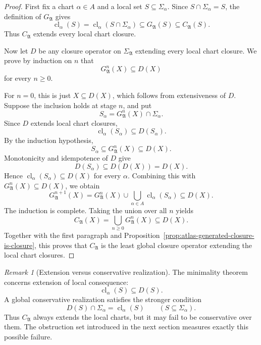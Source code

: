 \documentclass[11pt]{amsart}
\numberwithin{equation}{section}
\theoremstyle{plain}
\theoremstyle{definition}
\theoremstyle{remark}
\newtheorem{remark}[theorem]{Remark}
\newcommand{\Cl}{\operatorname{cl}}
\newcommand{\A}{\mathfrak A}
\newcommand{\Sig}{\Sigma}
\newcommand{\CA}{C_{\mathfrak A}}
\newcommand{\GA}{G_{\mathfrak A}}
\begin{document}
\begin{proof}
First fix a chart \(\alpha\in A\) and a local set \(S\subseteq\Sig_\alpha\). Since \(S\cap\Sig_\alpha=S\), the definition of \(\GA\) gives
\[
  \Cl_\alpha(S)=\Cl_\alpha(S\cap\Sig_\alpha)
  \subseteq \GA(S)
  \subseteq \CA(S).
\]
Thus \(\CA\) extends every local chart closure.

Now let \(D\) be any closure operator on \(\Sig_{\A}\) extending every local chart closure. We prove by induction on \(n\) that
\[
  \GA^n(X)\subseteq D(X)
\]
for every \(n\geq0\).

For \(n=0\), this is just \(X\subseteq D(X)\), which follows from extensiveness of \(D\). Suppose the inclusion holds at stage \(n\), and put
\[
  S_\alpha=\GA^n(X)\cap\Sig_\alpha.
\]
Since \(D\) extends local chart closures,
\[
  \Cl_\alpha(S_\alpha)\subseteq D(S_\alpha).
\]
By the induction hypothesis,
\[
  S_\alpha\subseteq \GA^n(X)\subseteq D(X).
\]
Monotonicity and idempotence of \(D\) give
\[
  D(S_\alpha)\subseteq D(D(X))=D(X).
\]
Hence \(\Cl_\alpha(S_\alpha)\subseteq D(X)\) for every \(\alpha\). Combining this with \(\GA^n(X)\subseteq D(X)\), we obtain
\[
  \GA^{n+1}(X)
  =\GA^n(X)\cup\bigcup_{\alpha\in A}\Cl_\alpha(S_\alpha)
  \subseteq D(X).
\]
The induction is complete. Taking the union over all \(n\) yields
\[
  \CA(X)=\bigcup_{n\geq0}\GA^n(X)\subseteq D(X).
\]
Together with the first paragraph and Proposition~\ref{prop:atlas-generated-closure-is-closure}, this proves that \(\CA\) is the least global closure operator extending the local chart closures.
\end{proof}

\begin{remark}[Extension versus conservative realization]
The minimality theorem concerns extension of local consequence:
\[
  \Cl_\alpha(S)\subseteq D(S).
\]
A global conservative realization satisfies the stronger condition
\[
  D(S)\cap\Sig_\alpha=\Cl_\alpha(S)
  \qquad(S\subseteq\Sig_\alpha).
\]
Thus \(\CA\) always extends the local charts, but it may fail to be conservative over them. The obstruction set introduced in the next section measures exactly this possible failure.
\end{remark}
\end{document}
